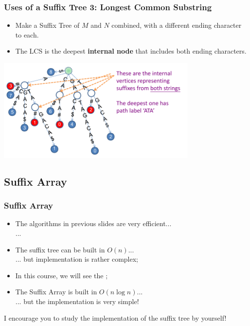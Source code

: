 \begin{frame}
  \frametitle{Uses of a Suffix Tree 3: Longest Common Substring}
    \begin{itemize}
    \item Make a Suffix Tree of $M$ and $N$ combined, with a different ending character to each.
    \item The LCS is the deepest {\bf internal node} that includes both ending characters.
    \end{itemize}
  \begin{center}
    \includegraphics[width=0.75\textwidth]{../img/longestcommonsubstring_halim}
  \end{center}
\end{frame}

\subsection{Suffix Array}
\begin{frame}
  \frametitle{Suffix Array}
  \begin{itemize}
    \item The algorithms in previous slides are very efficient...\\
      ... 

      \medskip

    \item The suffix tree can be built in $O(n)$...\\
      ... but implementation is rather complex;

      \medskip

    \item In this course, we will see the ;

      \medskip

    \item The Suffix Array is built in $O(n\log{n})$...\\
      ... but the implementation is very simple!
  \end{itemize}

  \vfill

  \begin{block}{}
    I encourage you to study the implementation of the suffix tree by yourself!
  \end{block}
\end{frame}

